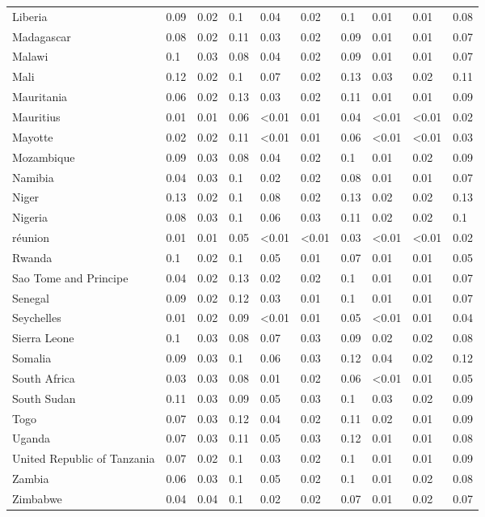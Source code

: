 \begin{longtable}[t]{llllllllll}
Liberia & 0.09 & 0.02 & 0.1 & 0.04 & 0.02 & 0.1 & 0.01 & 0.01 & 0.08\\
\addlinespace
Madagascar & 0.08 & 0.02 & 0.11 & 0.03 & 0.02 & 0.09 & 0.01 & 0.01 & 0.07\\
Malawi & 0.1 & 0.03 & 0.08 & 0.04 & 0.02 & 0.09 & 0.01 & 0.01 & 0.07\\
Mali & 0.12 & 0.02 & 0.1 & 0.07 & 0.02 & 0.13 & 0.03 & 0.02 & 0.11\\
Mauritania & 0.06 & 0.02 & 0.13 & 0.03 & 0.02 & 0.11 & 0.01 & 0.01 & 0.09\\
Mauritius & 0.01 & 0.01 & 0.06 & <0.01 & 0.01 & 0.04 & <0.01 & <0.01 & 0.02\\
\addlinespace
Mayotte & 0.02 & 0.02 & 0.11 & <0.01 & 0.01 & 0.06 & <0.01 & <0.01 & 0.03\\
Mozambique & 0.09 & 0.03 & 0.08 & 0.04 & 0.02 & 0.1 & 0.01 & 0.02 & 0.09\\
Namibia & 0.04 & 0.03 & 0.1 & 0.02 & 0.02 & 0.08 & 0.01 & 0.01 & 0.07\\
Niger & 0.13 & 0.02 & 0.1 & 0.08 & 0.02 & 0.13 & 0.02 & 0.02 & 0.13\\
Nigeria & 0.08 & 0.03 & 0.1 & 0.06 & 0.03 & 0.11 & 0.02 & 0.02 & 0.1\\
\addlinespace
réunion & 0.01 & 0.01 & 0.05 & <0.01 & <0.01 & 0.03 & <0.01 & <0.01 & 0.02\\
Rwanda & 0.1 & 0.02 & 0.1 & 0.05 & 0.01 & 0.07 & 0.01 & 0.01 & 0.05\\
Sao Tome and Principe & 0.04 & 0.02 & 0.13 & 0.02 & 0.02 & 0.1 & 0.01 & 0.01 & 0.07\\
Senegal & 0.09 & 0.02 & 0.12 & 0.03 & 0.01 & 0.1 & 0.01 & 0.01 & 0.07\\
Seychelles & 0.01 & 0.02 & 0.09 & <0.01 & 0.01 & 0.05 & <0.01 & 0.01 & 0.04\\
\addlinespace
Sierra Leone & 0.1 & 0.03 & 0.08 & 0.07 & 0.03 & 0.09 & 0.02 & 0.02 & 0.08\\
Somalia & 0.09 & 0.03 & 0.1 & 0.06 & 0.03 & 0.12 & 0.04 & 0.02 & 0.12\\
South Africa & 0.03 & 0.03 & 0.08 & 0.01 & 0.02 & 0.06 & <0.01 & 0.01 & 0.05\\
South Sudan & 0.11 & 0.03 & 0.09 & 0.05 & 0.03 & 0.1 & 0.03 & 0.02 & 0.09\\
Togo & 0.07 & 0.03 & 0.12 & 0.04 & 0.02 & 0.11 & 0.02 & 0.01 & 0.09\\
\addlinespace
Uganda & 0.07 & 0.03 & 0.11 & 0.05 & 0.03 & 0.12 & 0.01 & 0.01 & 0.08\\
United Republic of Tanzania & 0.07 & 0.02 & 0.1 & 0.03 & 0.02 & 0.1 & 0.01 & 0.01 & 0.09\\
Zambia & 0.06 & 0.03 & 0.1 & 0.05 & 0.02 & 0.1 & 0.01 & 0.02 & 0.08\\
Zimbabwe & 0.04 & 0.04 & 0.1 & 0.02 & 0.02 & 0.07 & 0.01 & 0.02 & 0.07\\*
\end{longtable}
\endgroup{}
